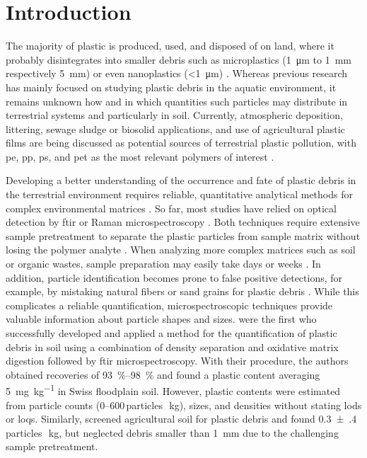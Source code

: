 \section{Introduction}

The majority of plastic is produced, used, and disposed of on land, where it probably disintegrates into smaller debris such as microplastics (\SI{1}{\micro\meter} to \SI{1}{\milli\meter} respectively \SI{5}{\milli\meter}) or even nanoplastics (\SI{<1}{\micro\meter}) \citep{HartmannAre2019,HurleyFate2018,WagnerThings2019}. Whereas previous research has mainly focused on studying plastic debris in the aquatic environment, it remains unknown how and in which quantities such particles may distribute in terrestrial systems and particularly in soil. Currently, atmospheric deposition, littering, sewage sludge or biosolid applications, and use of agricultural plastic films are being discussed as potential sources of terrestrial plastic pollution, with \ac{pe}, \ac{pp}, \ac{ps}, and \ac{pet} as the most relevant polymers of interest \citep{HurleyFate2018,WangMicroplastics2019}.

Developing a better understanding of the occurrence and fate of plastic debris in the terrestrial environment requires reliable, quantitative analytical methods for complex environmental matrices \citep{BlasingPlastics2018,HeMicroplastics2018,daCostaMicroplastics2018}. So far, most studies have relied on optical detection by \ac{ftir} or Raman microspectroscopy \citep{RennerAnalytical2018}. Both techniques require extensive sample pretreatment to separate the plastic particles from sample matrix without losing the polymer analyte \citep{HurleyValidation2018}. When analyzing more complex matrices such as soil or organic wastes, sample preparation may easily take days or weeks \citep{LoderEnzymatic2017}. In addition, particle identification becomes prone to false positive detections, for example, by mistaking natural fibers or sand grains for plastic debris \citep{BlasingPlastics2018}. While this complicates a reliable quantification, microspectroscopic techniques provide valuable information about particle shapes and sizes. \citet{ScheurerMicroplastics2018} were the first who successfully developed and applied a method for the quantification of plastic debris in soil using a combination of density separation and oxidative matrix digestion followed by \ac{ftir} microspectroscopy. With their procedure, the authors obtained recoveries of \SIrange{93}{98}{\percent} and found a plastic content averaging \SI{5}{\milli\gram\per\kilo\gram} in Swiss floodplain soil. However, plastic contents were estimated from particle counts (\numrange{0}{600}\,particles\,\si{\per\kilo\gram}), sizes, and densities without stating \acp{lod} or \acp{loq}. Similarly, \citet{PiehlIdentification2018} screened agricultural soil for plastic debris and found \num{0.3(4)}\,particles\,\si{\per\kilo\gram}, but neglected debris smaller than \SI{1}{\milli\meter} due to the challenging sample pretreatment.

